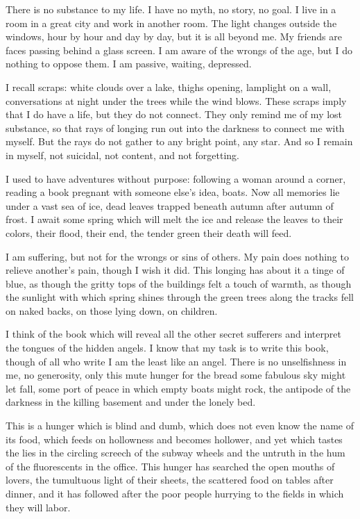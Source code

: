 \documentclass[english,11pt,letterpaper,onecolumn]{scrbook}
\begin{document}
\newpage
{}
	There is no substance to my life.  I have no myth, no story, no goal.  I live in a room in a great city and work in another room.  The light changes outside the windows, hour by hour and day by day, but it is all beyond me.  My friends are faces passing behind a glass screen.  I am aware of the wrongs of the age, but I do nothing to oppose them.  I am passive, waiting, depressed.

	I recall scraps:  white clouds over a lake, thighs opening, lamplight on a wall, conversations at night under the trees while the wind blows.  These scraps imply that I do have a life, but they do not connect.  They only remind me of my lost substance, so that rays of longing run out into the darkness to connect me with myself.  But the rays do not gather to any bright point, any star.  And so I remain in myself, not suicidal, not content, and not forgetting.

	I used to have adventures without purpose:  following a woman around a corner, reading a book pregnant with someone else's idea, boats.  Now all memories lie under a vast sea of ice, dead leaves trapped beneath autumn after autumn of frost.  I await some spring which will melt the ice and release the leaves to their colors, their flood, their end, the tender green their death will feed.

	I am suffering, but not for the wrongs or sins of others.  My pain does nothing to relieve another's pain, though I wish it did.  This longing has about it a tinge of blue, as though the gritty tops of the buildings felt a touch of warmth, as though the sunlight with which spring shines through the green trees along the tracks fell on naked backs, on those lying down, on children.

	I think of the book which will reveal all the other secret sufferers and interpret the tongues of the hidden angels.  I know that my task is to write this book, though of all who write I am the least like an angel.  There is no unselfishness in me, no generosity, only this mute hunger for the bread some fabulous sky might let fall, some port of peace in which empty boats might rock, the antipode of the darkness in the killing basement and under the lonely bed.

	This is a hunger which is blind and dumb, which does not even know the name of its food, which feeds on hollowness and becomes hollower, and yet which tastes the lies in the circling screech of the subway wheels and the untruth in the hum of the fluorescents in the office.  This hunger has searched the open mouths of lovers, the tumultuous light of their sheets, the scattered food on tables after dinner, and it has followed after the poor people hurrying to the fields in which they will labor.
\end{document}
